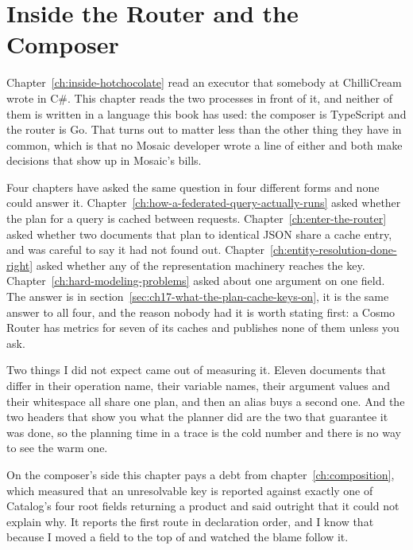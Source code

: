 \chapter{Inside the Router and the Composer}
\label{ch:inside-the-router-and-the-composer}

Chapter~\ref{ch:inside-hotchocolate} read an executor that somebody at
ChilliCream wrote in C\#. This chapter reads the two processes in front of it,
and neither of them is written in a language this book has used: the composer is
TypeScript and the router is Go. That turns out to matter less than the other
thing they have in common, which is that no Mosaic developer wrote a line of
either and both make decisions that show up in Mosaic's bills.

%
Four chapters have asked the same question in four different forms and none
could answer it. Chapter~\ref{ch:how-a-federated-query-actually-runs} asked
whether the plan for a query is cached between requests.
Chapter~\ref{ch:enter-the-router} asked whether two documents that plan to
identical JSON share a cache entry, and was careful to say it had not found out.
Chapter~\ref{ch:entity-resolution-done-right} asked whether any of the
representation machinery reaches the key.
Chapter~\ref{ch:hard-modeling-problems} asked about one argument on one field.
The answer is in section~\ref{sec:ch17-what-the-plan-cache-keys-on}, it is the
same answer to all four, and the reason nobody had it is worth stating first: a
Cosmo Router has metrics for seven of its caches and publishes none of them
unless you ask.

Two things I did not expect came out of measuring it. Eleven documents that
differ in their operation name, their variable names, their argument values and
their whitespace all share one plan, and then an alias buys a second one. And
the two headers that show you what the planner did are the two that guarantee it
was done, so the planning time in a trace is the cold number and there is no way
to see the warm one.

%
On the composer's side this chapter pays a debt from
chapter~\ref{ch:composition}, which measured that an unresolvable key is
reported against exactly one of Catalog's four root fields returning a product
and said outright that it could not explain why. It reports the first route in
declaration order, and I know that because I moved a field to the top of
 and watched the blame follow it.

